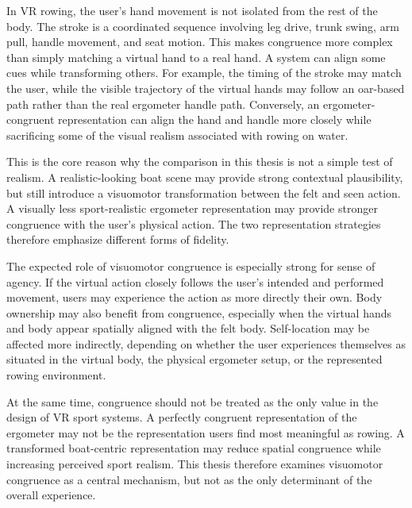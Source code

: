 In VR rowing, the user's hand movement is not isolated from the rest of the body. The stroke is a coordinated sequence involving leg drive, trunk swing, arm pull, handle movement, and seat motion. This makes congruence more complex than simply matching a virtual hand to a real hand. A system can align some cues while transforming others. For example, the timing of the stroke may match the user, while the visible trajectory of the virtual hands may follow an oar-based path rather than the real ergometer handle path. Conversely, an ergometer-congruent representation can align the hand and handle more closely while sacrificing some of the visual realism associated with rowing on water.

This is the core reason why the comparison in this thesis is not a simple test of realism. A realistic-looking boat scene may provide strong contextual plausibility, but still introduce a visuomotor transformation between the felt and seen action. A visually less sport-realistic ergometer representation may provide stronger congruence with the user's physical action. The two representation strategies therefore emphasize different forms of fidelity.

The expected role of visuomotor congruence is especially strong for sense of agency. If the virtual action closely follows the user's intended and performed movement, users may experience the action as more directly their own. Body ownership may also benefit from congruence, especially when the virtual hands and body appear spatially aligned with the felt body. Self-location may be affected more indirectly, depending on whether the user experiences themselves as situated in the virtual body, the physical ergometer setup, or the represented rowing environment.

At the same time, congruence should not be treated as the only value in the design of VR sport systems. A perfectly congruent representation of the ergometer may not be the representation users find most meaningful as rowing. A transformed boat-centric representation may reduce spatial congruence while increasing perceived sport realism. This thesis therefore examines visuomotor congruence as a central mechanism, but not as the only determinant of the overall experience.

